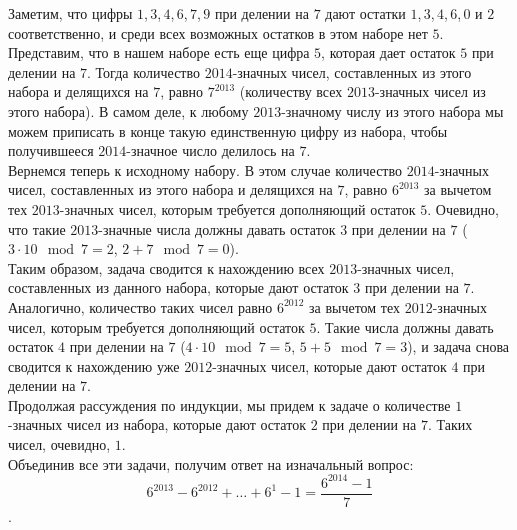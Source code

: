 \documentclass{article}
\begin{document}
Заметим, что цифры $1$,$\,3$,$\,4$,$\,6$,$\,7$,$\,9$ при делении на $7$ дают остатки $1$,$\,3$,$\,4$,$\,6$,$\,0$ и $2$ соответственно, и среди всех возможных остатков в 
этом наборе нет $5$. Представим, что в нашем наборе есть еще цифра $5$, которая дает остаток $5$ при делении на $7$. Тогда количество $2014$-значных чисел, составленных из этого 
набора и делящихся на $7$, равно $7^{2013}$ (количеству всех $2013$-значных чисел из этого набора). В самом деле, к любому $2013$-значному числу из этого набора мы можем приписать в конце 
такую единственную цифру из набора, чтобы получившееся $2014$-значное число делилось на $7$.\\
Вернемся теперь к исходному набору. В этом случае количество $2014$-значных чисел, составленных из этого набора и делящихся на $7$, равно $6^{2013}$ за вычетом тех $2013$-значных чисел, 
которым требуется дополняющий остаток $5$. Очевидно, что такие $2013$-значные числа должны давать остаток $3$ при делении на $7$ ($3\cdot 10 \mod 7 = 2$, $2+7 \mod 7 = 0$).\\
Таким образом, задача сводится к нахождению всех $2013$-значных чисел, составленных из данного набора, которые дают остаток $3$ при делении на $7$. Аналогично, количество таких чисел 
равно $6^{2012}$ за вычетом тех $2012$-значных чисел, которым требуется дополняющий остаток $5$. Такие числа должны давать остаток $4$ при делении на $7$ ($4\cdot 10 \mod 7 =5$, $5+5 \mod 7 = 3$), и 
задача снова сводится к нахождению уже $2012$-значных чисел, которые дают остаток $4$ при делении на $7$.\\
Продолжая рассуждения по индукции, мы придем к задаче о количестве $1$-значных чисел из набора, которые дают остаток $2$ при делении на $7$. Таких чисел, очевидно, $1$.\\
Объединив все эти задачи, получим ответ на изначальный вопрос:
$$6^{2013} - 6^{2012} + \ldots + 6^1 - 1 = \frac{6^{2014}-1}{7}$$.
\end{document}
